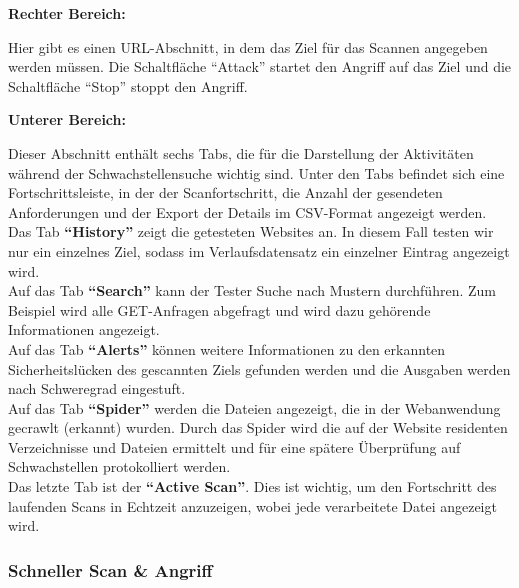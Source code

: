 \begin{flushleft}
	\textbf{Rechter Bereich:}\\
\end{flushleft}
Hier gibt es einen URL-Abschnitt, in dem das Ziel für das Scannen angegeben werden müssen. Die Schaltfläche "`Attack"' startet den Angriff auf das Ziel und die Schaltfläche "`Stop"' stoppt den Angriff.

\begin{flushleft}
	\textbf{Unterer Bereich:}\\
\end{flushleft}
Dieser Abschnitt enthält sechs Tabs, die für die Darstellung der Aktivitäten während der Schwachstellensuche wichtig sind. Unter den Tabs befindet sich eine Fortschrittsleiste, in der der Scanfortschritt, die Anzahl der gesendeten Anforderungen und der Export der Details im CSV-Format angezeigt werden.\\

Das Tab \textbf{"`History"'} zeigt die getesteten Websites an. In diesem Fall testen wir nur ein einzelnes Ziel, sodass im Verlaufsdatensatz ein einzelner Eintrag angezeigt wird.\\

Auf das Tab \textbf{"`Search"'} kann der Tester Suche nach Mustern durchführen. Zum Beispiel wird alle GET-Anfragen abgefragt und wird dazu gehörende Informationen angezeigt.\\

Auf das Tab \textbf{"`Alerts"'} können weitere Informationen zu den erkannten Sicherheitslücken des gescannten Ziels gefunden werden und die Ausgaben werden nach Schweregrad eingestuft.\\

Auf das Tab \textbf{"`Spider"'} werden die Dateien angezeigt, die in der Webanwendung gecrawlt (erkannt) wurden. Durch das Spider wird die auf der Website residenten Verzeichnisse und Dateien ermittelt und für eine spätere Überprüfung auf Schwachstellen protokolliert werden.\\

Das letzte Tab ist der \textbf{"`Active Scan"'}. Dies ist wichtig, um den Fortschritt des laufenden Scans in Echtzeit anzuzeigen, wobei jede verarbeitete Datei angezeigt wird.\\

\subsubsection{Schneller Scan \& Angriff}

